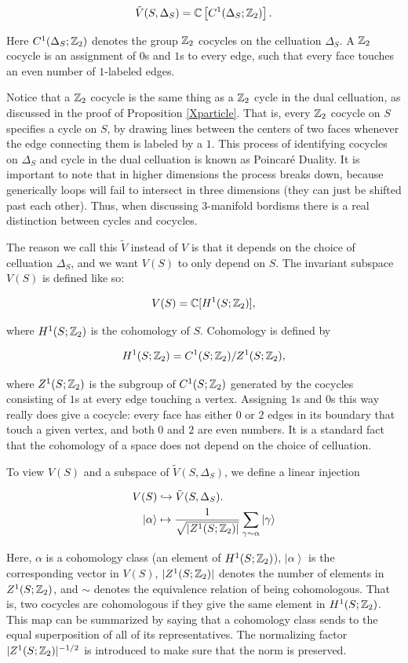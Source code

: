 \documentclass{article}
\theoremstyle{definition}
\numberwithin{figure}{section}
\begin{document}
$$\tilde{V}(S,\Delta_S)=\mathbb{C}\left[C^{1}(\Delta_S;\mathbb{Z}_2)\right].$$

Here $C^1(\Delta_S;\mathbb{Z}_2)$ denotes the group $\mathbb{Z}_2$ cocycles on the celluation $\Delta_S$. A $\mathbb{Z}_2$ cocycle is an assignment of $0$s and $1$s to every edge, such that every face touches an even number of $1$-labeled edges.

Notice that a $\mathbb{Z}_2$ cocycle is the same thing as a $\mathbb{Z}_2$ cycle in the dual celluation, as discussed in the proof of Proposition \ref{Xparticle}. That is, every $\mathbb{Z}_2$ cocycle on $S$ specifies a cycle on $S$, by drawing lines between the centers of two faces whenever the edge connecting them is labeled by a $1$. This process of identifying cocycles on $\Delta_S$ and cycle in the dual celluation is known as Poincaré Duality. It is important to note that in higher dimensions the process breaks down, because generically loops will fail to intersect in three dimensions (they can just be shifted past each other). Thus, when discussing 3-manifold bordisms there is a real distinction between cycles and cocycles.

The reason we call this $\tilde{V}$ instead of $V$ is that it depends on the choice of celluation $\Delta_S$, and we want $V(S)$ to only depend on $S$. The invariant subspace $V(S)$ is defined like so:

$$V(S)=\mathbb{C}[H^1(S;\mathbb{Z}_2)],$$

where $H^1(S;\mathbb{Z}_2)$ is the cohomology of $S$. Cohomology is defined by

$$H^1(S;\mathbb{Z}_2)=C^1(S;\mathbb{Z}_2)/Z^1(S;\mathbb{Z}_2),$$

where $Z^1(S;\mathbb{Z}_2)$ is the subgroup of $C^1(S;\mathbb{Z}_2)$ generated by the cocycles consisting of $1$s at every edge touching a vertex. Assigning $1$s and $0$s this way really does give a cocycle: every face has either $0$ or $2$ edges in its boundary that touch a given vertex, and both $0$ and $2$ are even numbers. It is a standard fact that the cohomology of a space does not depend on the choice of celluation.

To view $V(S)$ and a subspace of $\tilde{V}(S,\Delta_S)$, we define a linear injection

\begin{align*}
V(S)&\hookrightarrow \tilde{V}(S,\Delta_S).\\
\left|\alpha\right>&\mapsto \frac{1}{\sqrt{|Z^1(S;\mathbb{Z}_2)|}}\sum_{\gamma\sim \alpha}\left|\gamma\right>
\end{align*}

Here, $\alpha$ is a cohomology class (an element of $H^1(S;\mathbb{Z}_2)$), $\left|\alpha\right>$ is the corresponding vector in $V(S)$, $|Z^1(S;\mathbb{Z}_2)|$ denotes the number of elements in $Z^1(S;\mathbb{Z}_2)$, and $\sim$ denotes the equivalence relation of being cohomologous. That is, two cocycles are cohomologous if they give the same element in $H^1(S;\mathbb{Z}_2)$. This map can be summarized by saying that a cohomology class sends to the equal superposition of all of its representatives. The normalizing factor $|Z^1(S;\mathbb{Z}_2)|^{-1/2}$ is introduced to make sure that the norm is preserved.
\end{document}
